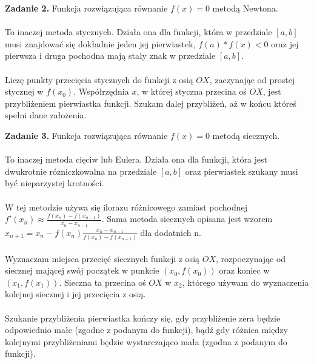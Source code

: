 \documentclass[15pt, a4paper]{article}
\begin{document}

\noindent\textbf{Zadanie 2.} Funkcja rozwiązująca równanie \( f(x) = 0 \) metodą Newtona.\\\\
\noindent To inaczej metoda stycznych. Działa ona dla funkcji, która w przedziale \([a, b]\) musi znajdować się dokładnie jeden jej pierwiastek,  \(f(a) * f(x) < 0 \) oraz jej pierwsza i druga pochodna mają stały znak w przedziale \( [a, b] \).\\\\
\noindent Liczę punkty przecięcia stycznych do funkcji z osią \( OX \), zaczynając od prostej stycznej w \( f(x_0) \). Współrzędnia \(x\), w której styczna przecina oś \(OX\), jest przybliżeniem pierwiastka funkcji. Szukam dalej przybliżeń, aż w końcu któreś spełni dane założenia. 

\vspace{0.5cm}

\noindent\hrulefill

\vspace{0.5cm}


\noindent\textbf{Zadanie 3.} Funkcja rozwiązująca równanie \( f(x) = 0 \) metodą siecznych.\\\\
\noindent To inaczej metoda cięciw lub Eulera. Działa ona dla funkcji, która jest dwukrotnie rózniczkowalna na przedziale \([a, b]\) oraz pierwiastek szukany musi być nieparzystej krotności. \\\\
\noindent W tej metodzie używa się ilorazu różnicowego zamiast pochodnej \(f'(x_n) \approx \frac{f(x_n) - f(x_{n-1})}{x_n - x_{n-1}}\). Sama metoda siecznych opisana jest wzorem \(x_{n+1} = x_n - f(x_n) \frac{x_n - x_{n-1}}{f(x_n) - f(x_{n-1})}\) dla dodatnich n.\\\\
\noindent Wyznaczam miejsca przecięć siecznych funkcji z osią \(OX\), rozpoczynając od siecznej mającej swój początek w punkcie \((x_0, f(x_0))\) oraz koniec w \((x_1, f(x_1))\). Sieczna ta przecina oś \(OX\) w \(x_2\), którego używam do wyznaczenia kolejnej siecznej i jej przecięcia z osią. \\\\
\noindent Szukanie przybliżenia pierwiastka kończy się, gdy przybliżenie zera będzie odpowiednio małe (zgodne z podanym do funkcji), bądź gdy różnica między kolejnymi przybliżeniami będzie wystarczająco mała (zgodna z podanym do funkcji).
\end{document}

